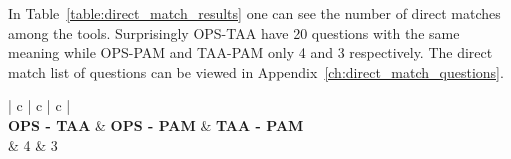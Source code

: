 
In Table~\ref{table:direct_match_results} one can see the number of direct matches among the tools. Surprisingly \ac{OPS}-\ac{TAA} have 20 questions with the same meaning while \ac{OPS}-\ac{PAM} and \ac{TAA}-\ac{PAM} only 4 and 3 respectively. The direct match list of questions can be viewed in Appendix~\ref{ch:direct_match_questions}. 

\begin{table} [H]
	\begin{tabular}{{| c | c | c |}}
		\hline
		  \\ \hline
		\textbf{OPS - TAA} & \textbf{OPS - PAM} & \textbf{TAA - PAM} \\  & 4 & 3 \\ \hline
	\end{tabular}
\caption{Direct Match Questions Among Tools - Results}
\label{table:direct_match_results}
\end{table} 
